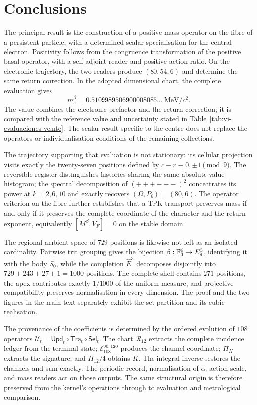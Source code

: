 \section{Conclusions}
\label{vi:sec:conclusiones}

The principal result is the construction of a positive mass operator on
the fibre of a persistent particle, with a determined scalar
specialisation for the central electron. Positivity follows from the
congruence transformation of the positive basal operator, with a self-adjoint
reader and positive action ratio. On the electronic trajectory, the two
readers produce \((80,54,6)\) and determine the same return correction.
In the adopted dimensional chart, the complete evaluation gives
\[
 m_e^{\beta}=0.5109989506900008086\ldots\ \mathrm{MeV}/c^2.
\]
The value combines the electronic prefactor and the return correction;
it is compared with the reference value and uncertainty stated in
Table~\ref{tab:vi-evaluaciones-veinte}. The scalar result specific to the
centre does not replace the operators or individualisation conditions of
the remaining collections.

The trajectory supporting that evaluation is not stationary: its cellular
projection visits exactly the twenty-seven positions defined by
$c-r\equiv0,\pm1\pmod9$. The reversible register distinguishes histories
sharing the same absolute-value histogram; the spectral decomposition of
$(+++---)^2$ concentrates its power at $k=2,6,10$ and exactly recovers
$(\Omega,P_6)=(80,6)$. The operator criterion on the fibre further establishes
that a TPK transport preserves mass if and only if it preserves the complete
coordinate of the character and the return exponent, equivalently
$[M^\beta,V_F]=0$ on the stable domain.

The regional ambient space of \(729\) positions is likewise not left as an
isolated cardinality. Pairwise trit grouping gives the bijection
\(\beta:\mathbb F_3^6\to E_9^3\), identifying it with the body \(S_0\), while
the completion \(\widehat E^3\) decomposes disjointly into
\(729+243+27+1=1000\) positions. The complete shell contains \(271\)
positions, the apex contributes exactly \(1/1000\) of the uniform measure,
and projective compatibility preserves normalisation in every dimension.
The proof and the two figures in the main text separately exhibit the set
partition and its cubic realisation.

The provenance of the coefficients is determined by the ordered
evolution of \(108\) operators
\(\mathcal U_t=\mathsf{Upd}_t\circ\mathsf{Tra}_t\circ\mathsf{Sel}_t\).
The chart \(\mathcal R_{12}\) extracts the complete incidence ledger
from the terminal state; \(\mathcal E_{108}^{90,120}\) produces the
channel coordinate; \(\Pi_H\) extracts the signature; and \(H_{12}/4\)
obtains \(K\). The integral inverse restores the channels and sum
exactly. The periodic record, normalisation of \(\alpha\), action scale,
and mass readers act on those outputs. The same structural origin is
therefore preserved from the kernel's operations through to evaluation
and metrological comparison.

